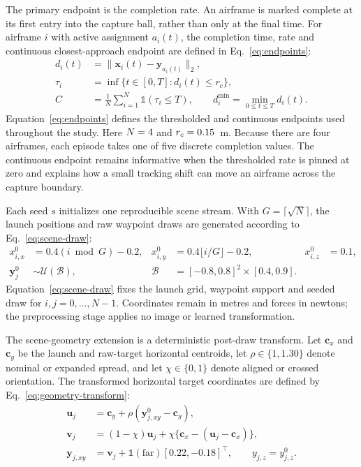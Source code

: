 The primary endpoint is the completion rate. An airframe is marked complete at its
first entry into the capture ball, rather than only at the final time. For airframe
$i$ with active assignment $a_i(t)$, the completion time, rate and continuous
closest-approach endpoint are defined in Eq.~\eqref{eq:endpoints}:
\begin{equation}
  \begin{aligned}
  d_i(t)&=\lVert\mathbf{x}_i(t)-\mathbf{y}_{a_i(t)}\rVert_2,\\
  \tau_i&=\inf\{t\in[0,T]:d_i(t)\le r_c\},\\
  C&=\frac{1}{N}\sum_{i=1}^{N}\mathbb{1}(\tau_i\le T),\qquad
  d_i^{\min}=\min_{0\le t\le T}d_i(t) .
  \end{aligned}
  \label{eq:endpoints}
\end{equation}
Equation~\eqref{eq:endpoints} defines the thresholded and continuous endpoints
used throughout the study. Here $N=4{}$ and $r_c=0.15{}$~m. Because there are four
airframes, each episode takes one of five discrete completion values. The
continuous endpoint remains informative when the thresholded rate is pinned at
zero and explains how a small tracking shift can move an airframe across the
capture boundary.

Each seed $s$ initializes one reproducible scene stream. With
$G=\lceil\sqrt{N}\rceil$, the launch positions and raw waypoint draws are
generated according to Eq.~\eqref{eq:scene-draw}:
\begin{equation}
  \begin{aligned}
  x^{0}_{i,x}&=0.4(i\bmod G)-0.2,&
  x^{0}_{i,y}&=0.4\lfloor i/G\rfloor-0.2,&
  x^{0}_{i,z}&=0.1,\\
  \mathbf{y}^{0}_j&\sim\mathcal{U}(\mathcal{B}),&
  \mathcal{B}&=[-0.8,0.8]^2\times[0.4,0.9].
  \end{aligned}
  \label{eq:scene-draw}
\end{equation}
Equation~\eqref{eq:scene-draw} fixes the launch grid, waypoint support and seeded
draw for $i,j=0,\ldots,N-1$. Coordinates remain in metres and forces in newtons;
the preprocessing stage applies no image or learned transformation.

The scene-geometry extension is a deterministic post-draw transform. Let
$\mathbf{c}_x$ and $\mathbf{c}_y$ be the launch and raw-target horizontal
centroids, let $\rho\in\{1,1.30\}$ denote nominal or expanded spread, and let
$\chi\in\{0,1\}$ denote aligned or crossed orientation. The transformed horizontal
target coordinates are defined by Eq.~\eqref{eq:geometry-transform}:
\begin{equation}
  \begin{aligned}
  \mathbf{u}_j&=\mathbf{c}_y+\rho(\mathbf{y}^{0}_{j,xy}-\mathbf{c}_y),\\
  \mathbf{v}_j&=(1-\chi)\mathbf{u}_j+\chi\{\mathbf{c}_x-(\mathbf{u}_j-\mathbf{c}_x)\},\\
  \mathbf{y}_{j,xy}&=\mathbf{v}_j+\mathbb{1}(\text{far})[0.22,-0.18]^{\top},
  \qquad y_{j,z}=y^{0}_{j,z} .
\end{aligned}
  \label{eq:geometry-transform}
\end{equation}

